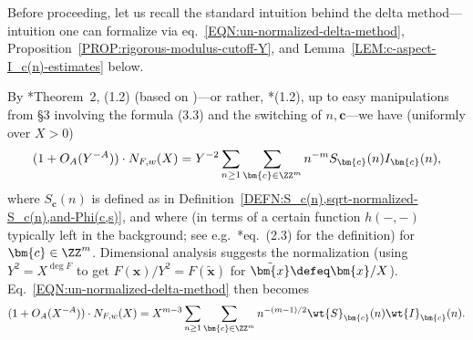 \documentclass[12pt]{report}
\begin{document}
Before proceeding, let us recall the standard intuition behind the delta method---intuition one can formalize via eq.~\eqref{EQN:un-normalized-delta-method}, Proposition~\ref{PROP:rigorous-modulus-cutoff-Y}, and Lemma~\ref{LEM:c-aspect-I_c(n)-estimates} below.

By \cite{heath1996new}*{Theorem~2, (1.2)} (based on \cite{duke1993bounds})---or rather, \cite{heath1996new}*{(1.2),
up to easy manipulations from \S3 involving the formula (3.3) and the switching of $n,\bm{c}$}---we have (uniformly over $X>0$)
\begin{equation}
\label{EQN:un-normalized-delta-method}
(1+O_A(Y^{-A}))\cdot N_{F,w}(X)
= Y^{-2}\sum_{n\geq1}
\sum_{\bm{c}\in\ZZ^m}
n^{-m}S_{\bm{c}}(n)I_{\bm{c}}(n),
\end{equation}
where $S_{\bm{c}}(n)$ is defined as in Definition~\ref{DEFN:S_c(n),sqrt-normalized-S_c(n),and-Phi(c,s)},
and where (in terms of a certain function $h(-,-)$ typically left in the background; see e.g.~\cite{heath1998circle}*{eq.~(2.3)} for the definition)
for $\bm{c}\in \ZZ^m$.
Dimensional analysis suggests the normalization
(using $Y^2 = X^{\deg F}$ to get $F(\bm{x})/Y^2 = F(\tilde{\bm{x}})$ for $\tilde{\bm{x}} \defeq \bm{x}/X$).
Eq.~\eqref{EQN:un-normalized-delta-method} then becomes
\begin{equation}
\label{EQN:normalized-delta-method}
(1+O_A(X^{-A}))\cdot N_{F,w}(X)
= X^{m-3}\sum_{n\geq1}
\sum_{\bm{c}\in\ZZ^m} n^{-(m-1)/2}\wt{S}_{\bm{c}}(n)\wt{I}_{\bm{c}}(n).
\end{equation}
\end{document}
